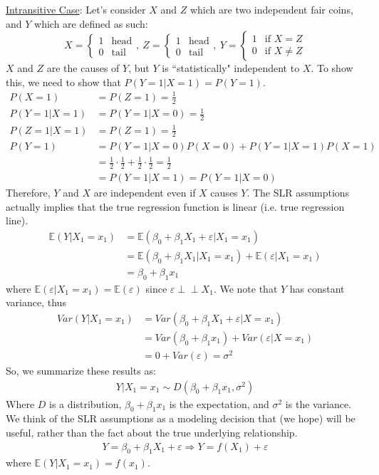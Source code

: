 \documentclass{article}
\newcommand{\indep}{\perp \!\!\! \perp}
\newcommand{\E}{\mathbb{E}}
\begin{document}
\underline{Intransitive Case}:
Let's consider $X$ and $Z$ which are two independent fair coins, and $Y$ which are defined as such:
\[X = \begin{cases}
1 & \text{head}\\
0 & \text{tail}
\end{cases},\ Z = \begin{cases}
1 & \text{head}\\
0 & \text{tail}
\end{cases},\ Y = \begin{cases}
1 & \text{if } X = Z\\
0 & \text{if } X \ne Z
\end{cases}\]
$X$ and $Z$ are the causes of $Y$, but $Y$ is ``statistically" independent to $X$. To show this, we need to show that $P(Y=1|X=1) =  P(Y=1)$.
\begin{align*}
    P(X = 1) &= P(Z=1) = \frac{1}{2}\\
    P(Y=1|X=1) &= P(Y=1|X=0) = \frac{1}{2}\\
    P(Z=1|X=1) &= P(Z=1) = \frac{1}{2}\\
    P(Y=1) &= P(Y=1|X=0)P(X=0) + P(Y=1|X=1)P(X=1)\\
    &= \frac{1}{2}\cdot \frac{1}{2} + \frac{1}{2} \cdot \frac{1}{2} = \frac{1}{2}\\
    &= P(Y=1|X=1) = P(Y=1|X=0)
\end{align*}
Therefore, $Y$ and $X$ are independent even if $X$ causes $Y$.
\bigbreak\noindent The SLR assumptions actually implies that the true regression function is linear (i.e. true regression line).
\begin{align}
    \E(Y|X_1 = x_1) &= \E(\beta_0 + \beta_1X_1 + \varepsilon| X_1 = x_1)\\
    &= \E(\beta_0 + \beta_1X_1 | X_1 = x_1) + \E(\varepsilon|X_1 = x_1)\\
    &= \beta_0 + \beta_1x_1
\end{align}
where $\E(\varepsilon | X_1 = x_1) = \E(\varepsilon)$ since $\varepsilon \indep X_1$. We note that $Y$ has constant variance, thus
\begin{align}
    Var(Y|X_1 = x_1) &= Var(\beta_0 + \beta_1X_1 + \varepsilon | X = x_1)\\
    &= Var(\beta_0 + \beta_1x_1) + Var(\varepsilon | X = x_1)\\
    &= 0 + Var(\varepsilon) = \sigma^2
\end{align}
So, we summarize these results as:
\begin{align}
    Y|X_1 = x_1 \sim D(\beta_0 + \beta_1x_1, \sigma^2)
\end{align}
Where $D$ is a distribution, $\beta_0 + \beta_1x_1$ is the expectation, and $\sigma^2$ is the variance.
\bigbreak\noindent
We think of the SLR assumptions as a modeling decision that (we hope) will be useful, rather than the fact about the true underlying relationship.
\begin{align}
    Y = \beta_0 + \beta_1X_1 + \varepsilon \Rightarrow Y = f(X_1) + \varepsilon
\end{align}
where $\E(Y|X_1 = x_1) = f(x_1)$.
\end{document}
